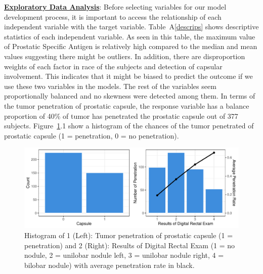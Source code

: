 \documentclass[11pt]{article}\usepackage[]{graphicx}\usepackage[]{color}
\makeatletter
\def\maxwidth{ %
  \ifdim\Gin@nat@width>\linewidth
    \linewidth
  \else
    \Gin@nat@width
  \fi
}
\makeatother
\begin{document}
\noindent\textbf{\underline{Exploratory Data Analysis}}: Before selecting variables for our model development process, it is important to access the relationship of each independent variable with the target variable. Table~A\ref{descrips} shows descriptive statistics of each independent variable. As seen in this table, the maximum value of Prostatic Specific Antigen is relatively high compared to the median and mean values suggesting there might be outliers. In addition, there are disproportion weights of each factor in race of the subjects and detection of capsular involvement. This indicates that it might be biased to predict the outcome if we use these two variables in the models. The rest of the variables seem proportionally balanced and no skewness were detected among them. In terms of the tumor penetration of prostatic capsule, the response variable has a balance proportion of 40\% of tumor has penetrated the prostatic capsule out of 377 subjects. Figure~\ref{explore1}.1 show a histogram of the chances of the tumor penetrated of prostatic capsule (1 = penetration, 0 = no penetration). 

\begin{figure}[h!] 
\begin{center}

\includegraphics[width=\maxwidth]{figure/unnamed-chunk-1-1} 

\caption{Histogram of 1 (Left): Tumor penetration of prostatic capsule (1 = penetration) and 2 (Right): Results of Digital Rectal Exam (1 = no nodule, 2 = unilobar nodule left, 3 = unilobar nodule right, 4 = bilobar nodule) with average penetration rate in black.}
\label{explore1}
\end{center} 
\end{figure}
\end{document}
